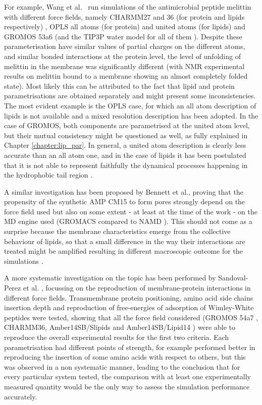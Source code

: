 For example, Wang et al.\ \cite{Wang2014} run simulations of the antimicrobial peptide melittin with different force fields, namely CHARMM27 and 36 (for protein and lipids respectively) \cite{MacKerell1998,Klauda2010}, OPLS all atoms (for protein) and united atoms (for lipids) \cite{Jorgensen1996} and GROMOS 53a6 \cite{Oostenbrink2004} (and the TIP3P water model for all of them \cite{Jorgensen1983}).
%
Despite these parameterisation have similar values of partial charges on the different atoms, and similar bonded interactions at the protein level, the level of unfolding of melittin in the membrane was significantly different (with NMR experimental results on melittin bound to a membrane showing an almost completely folded state). Most likely this can be attributed to the fact that lipid and protein parametrisations are obtained separately and might present some inconsistencies. The most evident example is the OPLS case, for which an all atom description of lipids is not available and a mixed resolution description has been adopted. In the case of GROMOS, both components are parametrised at the united atom level, but their mutual consistency might be questioned as well, as fully explained in Chapter \ref{chapter:lip_par}. In general, a united atom description is clearly less accurate than an all atom one, and in the case of lipids it has been postulated that it is not able to represent faithfully the dynamical processes happening in the hydrophobic tail region \cite{Chowdhary2013}.

A similar investigation has been proposed by Bennett et al., proving that the propensity of the synthetic AMP CM15 to form pores strongly depend on the force field used but also on some extent - at least at the time of the work - on the MD engine used (GROMACS compared to NAMD \cite{Phillips2005}). This should not come as a surprise because the membrane characteristics emerge from the collective behaviour of lipids, so that a small difference in the way their interactions are treated might be amplified resulting in different macroscopic outcome for the simulations \cite{Bennett2016}.

A more systematic investigation on the topic has been performed by Sandoval-Perez et al. \cite{Sandoval-Perez2017}, focussing on the reproduction of membrane-protein interactions in different force fields. Transmembrane protein positioning, amino acid side chains insertion depth and reproduction of free-energies of adsorption of Wimley-White peptides were tested, showing that all the force field considered (GROMOS 54a7 \cite{Schmid2011}, CHARMM36, Amber14SB/Slipids \cite{Jambeck2012} and Amber14SB/Lipid14 \cite{Dickson2014}) were able to reproduce the overall experimental results for the first two criteria. Each parametrisation had different points of strength, for example performed better in reproducing the insertion of some amino acids with respect to others, but this was observed in a non systematic manner, leading to the conclusion that for every particular system tested, the comparison with at least one experimentally measured quantity would be the only way to assess the simulation performance accurately.



